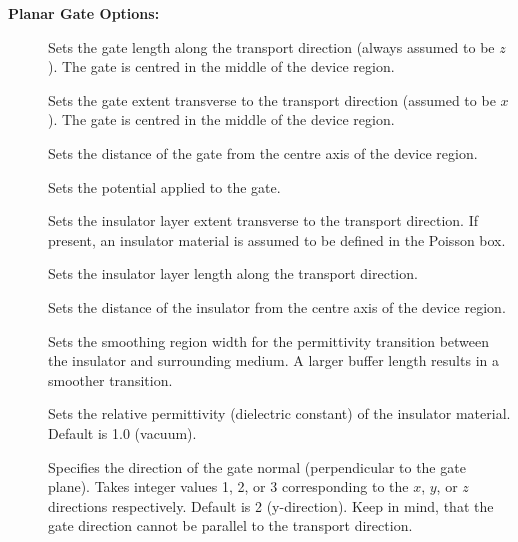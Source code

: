 {\bf Planar Gate Options:}
\begin{description}
\item[] Sets the gate length along the
  transport direction (always assumed to be $z$). The gate is centred in the
  middle of the device region.
\item[] Sets the gate extent
  transverse to the transport direction (assumed to be $x$). The gate is centred
  in the middle of the device region.
\item[] Sets the distance of the gate
  from the centre axis of the device region.
\item[] Sets the potential applied to
  the gate.
\item[] Sets the insulator layer
  extent transverse to the transport direction. If present, an insulator
  material is assumed to be defined in the Poisson box.
\item[] Sets the insulator layer
  length along the transport direction.
\item[] Sets the distance of the
  insulator from the centre axis of the device region.
\item[] Sets the smoothing region width
  for the permittivity transition between the insulator and surrounding medium.
  A larger buffer length results in a smoother transition.
\item[] Sets the relative
  permittivity (dielectric constant) of the insulator material. Default is 1.0
  (vacuum).
\item[] Specifies the direction of the gate normal (perpendicular
  to the gate plane). Takes integer values 1, 2, or 3 corresponding to the $x$,
  $y$, or $z$ directions respectively. Default is 2 (y-direction). Keep in mind, that
  the gate direction cannot be parallel to the transport direction.
\end{description}

